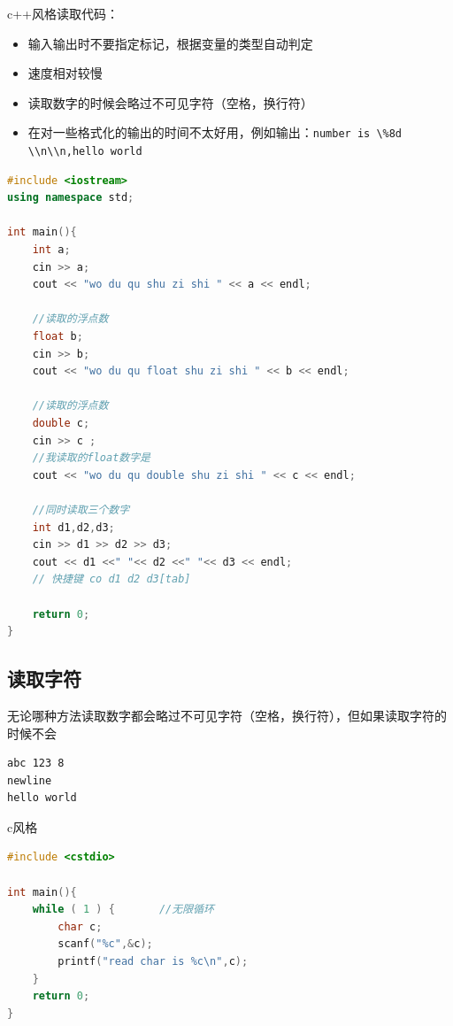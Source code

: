 \documentclass[
  paper=a4,
  ,captions=tableheading
]{scrbook}
\newcommand{\passthrough}[1]{#1}
\providecommand{\tightlist}{%
  \setlength{\itemsep}{0pt}\setlength{\parskip}{0pt}}
\begin{document}
c++风格读取代码：

\begin{itemize}
\tightlist
\item
  输入输出时不要指定标记，根据变量的类型自动判定
\item
  速度相对较慢
\item
  读取数字的时候会略过不可见字符（空格，换行符）
\item
  在对一些格式化的输出的时间不太好用，例如输出：\passthrough{\lstinline!number is \%8d \\n\\n,hello world!}
\end{itemize}

\begin{lstlisting}[language={C++}]
#include <iostream>
using namespace std;

int main(){
    int a;
    cin >> a;
    cout << "wo du qu shu zi shi " << a << endl;

    //读取的浮点数
    float b;
    cin >> b;
    cout << "wo du qu float shu zi shi " << b << endl;

    //读取的浮点数
    double c;
    cin >> c ;
    //我读取的float数字是
    cout << "wo du qu double shu zi shi " << c << endl;

    //同时读取三个数字
    int d1,d2,d3;
    cin >> d1 >> d2 >> d3;
    cout << d1 <<" "<< d2 <<" "<< d3 << endl;
    // 快捷键 co d1 d2 d3[tab]

    return 0;
}
\end{lstlisting}

\hypertarget{ux8bfbux53d6ux5b57ux7b26}{%
\subsection{读取字符}\label{ux8bfbux53d6ux5b57ux7b26}}

无论哪种方法读取数字都会略过不可见字符（空格，换行符），但如果读取字符的时候不会

\begin{lstlisting}
abc 123 8
newline
hello world
\end{lstlisting}

c风格

\begin{lstlisting}[language={C++}]
#include <cstdio>

int main(){
    while ( 1 ) {       //无限循环
        char c;
        scanf("%c",&c);
        printf("read char is %c\n",c);
    }
    return 0;
}
\end{lstlisting}
\end{document}
